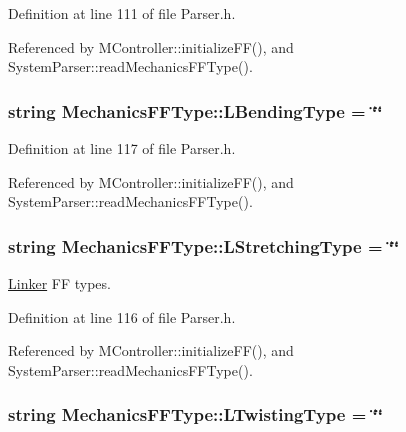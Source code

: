 Definition at line 111 of file Parser.\+h.



Referenced by M\+Controller\+::initialize\+F\+F(), and System\+Parser\+::read\+Mechanics\+F\+F\+Type().

\hypertarget{structMechanicsFFType_a14852de6199812e5e6c646f2a8479aac}{
\subsubsection[{L\+Bending\+Type}]{\setlength{\rightskip}{0pt plus 5cm}string Mechanics\+F\+F\+Type\+::\+L\+Bending\+Type = \char`\"{}\char`\"{}}}\label{structMechanicsFFType_a14852de6199812e5e6c646f2a8479aac}


Definition at line 117 of file Parser.\+h.



Referenced by M\+Controller\+::initialize\+F\+F(), and System\+Parser\+::read\+Mechanics\+F\+F\+Type().

\hypertarget{structMechanicsFFType_a1e03399a615a236fcb90a356d274681c}{
\subsubsection[{L\+Stretching\+Type}]{\setlength{\rightskip}{0pt plus 5cm}string Mechanics\+F\+F\+Type\+::\+L\+Stretching\+Type = \char`\"{}\char`\"{}}}\label{structMechanicsFFType_a1e03399a615a236fcb90a356d274681c}


\hyperlink{classLinker}{Linker} F\+F types. 



Definition at line 116 of file Parser.\+h.



Referenced by M\+Controller\+::initialize\+F\+F(), and System\+Parser\+::read\+Mechanics\+F\+F\+Type().

\hypertarget{structMechanicsFFType_a90c249f75ff2207d3ec927e1e8da57f1}{
\subsubsection[{L\+Twisting\+Type}]{\setlength{\rightskip}{0pt plus 5cm}string Mechanics\+F\+F\+Type\+::\+L\+Twisting\+Type = \char`\"{}\char`\"{}}}\label{structMechanicsFFType_a90c249f75ff2207d3ec927e1e8da57f1}


